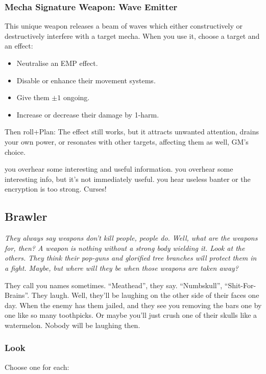 \subsubsection{Mecha Signature Weapon: Wave Emitter}
This unique weapon releases a beam of waves which either constructively or destructively interfere with a target mecha. When you use it, choose a target and an effect:
\begin{itemize}
\item Neutralise an EMP effect.
\item Disable or enhance their movement systems.
\item Give them $\pm 1$ ongoing.
\item Increase or decrease their damage by 1-harm.
\end{itemize}
Then roll+Plan:
{The effect still works, but it attracts unwanted attention, drains your own power, or resonates with other targets, affecting them as well, GM's choice.}

{you overhear some interesting and useful information.}
{you overhear some interesting info, but it's not immediately useful.}
{you hear useless banter or the encryption is too strong. Curses!}



\subsection{Brawler}
{\itshape They always say weapons don't kill people, people do. Well, what are the weapons for, then? A weapon is nothing without a strong body wielding it. Look at the others. They think their pop-guns and glorified tree branches will protect them in a fight. Maybe, but where will they be when those weapons are taken away?

They call you names sometimes. ``Meathead'', they say. ``Numbskull'', ``Shit-For-Brains''. They laugh. Well, they'll be laughing on the other side of their faces one day. When the enemy has them jailed, and they see you removing the bars one by one like so many toothpicks. Or maybe you'll just crush one of their skulls like a watermelon. Nobody will be laughing then.}

\subsubsection{Look}
Choose one for each:

